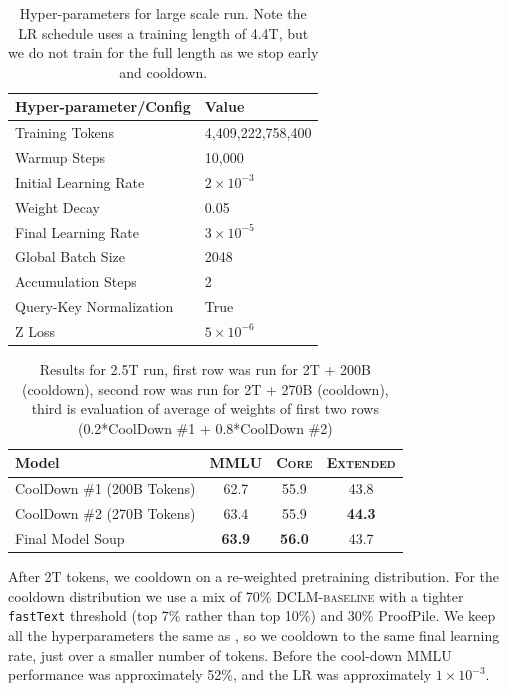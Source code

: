 \documentclass{article}
\newcommand{\hqpool}{\textsc{DCLM-baseline}\xspace}
\newcommand{\fasttext}{\texttt{fastText}\xspace}
\newcommand{\lowvar}{\textsc{Core}\xspace}
\newcommand{\aggscore}{\textsc{Extended}\xspace}
\begin{document}
\begin{table}[t]
    \centering
    \caption{Hyper-parameters for large scale run. Note the LR schedule uses a training length of 4.4T, but we do not train for the full length as we stop early and cooldown.}
    \begin{tabular}{ll}
        \toprule
        Hyper-parameter/Config & Value \\
        \midrule
        Training Tokens &  4,409,222,758,400  \\
        Warmup Steps & 10,000 \\
        Initial Learning Rate & $2\times 10^{-3}$ \\
        Weight Decay & 0.05 \\
        Final Learning Rate  & $3 \times 10^{-5}$ \\
        Global Batch Size & 2048 \\
        Accumulation Steps & 2 \\
        Query-Key Normalization & True \\
        Z Loss & $5 \times 10^{-6}$ \\
        \bottomrule
    \end{tabular}

    \label{tab:hyperparameters}
\end{table}

\begin{table}[t]
\centering
\caption{Results for 2.5T run, first row was run for 2T + 200B (cooldown), second row was run for 2T + 270B (cooldown), third is evaluation of average of weights of first two rows (0.2*CoolDown \#1 + 0.8*CoolDown \#2)}
\begin{tabular}{lccc}
\toprule
Model & MMLU & \lowvar & \aggscore \\
\midrule
CoolDown \#1 (200B Tokens) & 62.7 & 55.9 & 43.8 \\
CoolDown \#2 (270B Tokens) & 63.4 & 55.9 & \textbf{44.3} \\
Final Model Soup & \textbf{63.9} & \textbf{56.0} & 43.7 \\\bottomrule
\end{tabular}

\label{tab:hero_run_full}
\end{table}

After 2T tokens, we cooldown on a re-weighted pretraining distribution. For the cooldown distribution we use a mix of 70\% \hqpool with a tighter \fasttext threshold (top 7\% rather than top 10\%) and 30\% ProofPile.  We keep all the hyperparameters the same as , so we cooldown to the same final learning rate, just over a smaller number of tokens. Before the cool-down MMLU performance was approximately 52\%, and the LR was approximately $1 \times 10^{-3}$.
\end{document}
